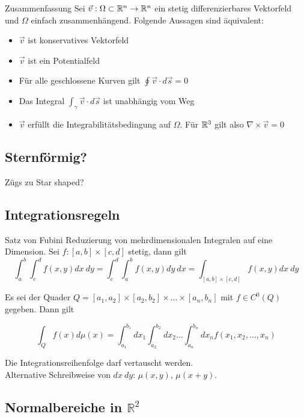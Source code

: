 \begin{Diverses}{Zusammenfassung}{}
	Sei $\vec{v} : \Omega \subset \mathbb{R}^n \to \mathbb{R}^n$ ein stetig differenzierbares Vektorfeld und $\Omega$ einfach zusammenhängend. Folgende Aussagen sind äquivalent:
	\begin{itemize}
		\item $\vec{v}$ ist konservatives Vektorfeld
		\item $\vec{v}$ ist ein Potentialfeld
		\item Für alle geschlossene Kurven gilt $\oint \vec{v} \cdot d\vec{s} = 0$
		\item Das Integral $\int_\gamma \vec{v} \cdot d\vec{s}$ ist unabhängig vom Weg
		\item $\vec{v}$ erfüllt die Integrabilitätsbedingung auf $\Omega$. Für $\mathbb{R}^3$ gilt also $\nabla \times \vec{v} = 0$
	\end{itemize}
\end{Diverses}
\subsection{Sternförmig?}

Zügs zu Star shaped?

\subsection{Integrationsregeln}

\begin{Satz}{Satz von Fubini}{}
    Reduzierung von mehrdimensionalen Integralen auf eine Dimension. Sei $f: [a,b] \times [c, d]$ stetig, dann gilt
    \[ \int_a^b \int_c^d f(x, y) dx ~ dy = \int_c^d \int_a^b f(x, y) dy ~ dx = \int_{[a,b] \times [c, d]} f(x, y) dx ~ dy   \]

    Es sei der Quader $Q = [a_1,a_2] \times [a_2, b_2] \times \dots \times [a_n, b_n]$ mit $f \in C^0(Q)$ gegeben. Dann gilt

    \[
        \int_Q f(x) d\mu(x) = \int_{a_1}^{b_1} dx_1 \int_{a_2}^{b_2} dx_2 \dots \int_{a_n}^{b_n} dx_n f(x_1, x_2,...,x_n)
    \]
\end{Satz}
Die Integrationsreihenfolge darf vertauscht werden.\\

Alternative Schreibweise von $dx ~ dy$: $\mu(x, y)$, $\mu(x+y)$.

\subsection{Normalbereiche in $\mathbb{R}^2$}

